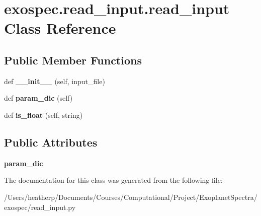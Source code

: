 \hypertarget{classexospec_1_1read__input_1_1read__input}{}\section{exospec.\+read\+\_\+input.\+read\+\_\+input Class Reference}
\label{classexospec_1_1read__input_1_1read__input}
\subsection*{Public Member Functions}
\begin{DoxyCompactItemize}
\item 
\mbox{\label{classexospec_1_1read__input_1_1read__input_a57a04569bc29445b8bd4f18502b150fe}} 
def {\bfseries \+\_\+\+\_\+init\+\_\+\+\_\+} (self, input\+\_\+file)
\item 
\mbox{\label{classexospec_1_1read__input_1_1read__input_a3b21e8723a95f914bb6c329ba68c3d86}} 
def {\bfseries param\+\_\+dic} (self)
\item 
\mbox{\label{classexospec_1_1read__input_1_1read__input_a79332c0dbddf207995b2ad5a602d97ce}} 
def {\bfseries is\+\_\+float} (self, string)
\end{DoxyCompactItemize}
\subsection*{Public Attributes}
\begin{DoxyCompactItemize}
\item 
\mbox{\label{classexospec_1_1read__input_1_1read__input_a3f4c545f0ae322e1a7252a0bf66f3d9f}} 
{\bfseries param\+\_\+dic}
\end{DoxyCompactItemize}


The documentation for this class was generated from the following file\+:\begin{DoxyCompactItemize}
\item 
/\+Users/heatherp/\+Documents/\+Courses/\+Computational/\+Project/\+Exoplanet\+Spectra/exospec/read\+\_\+input.\+py\end{DoxyCompactItemize}
